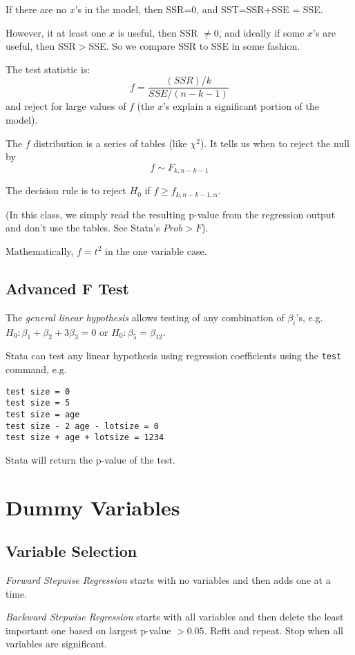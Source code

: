 \documentclass[11pt, oneside]{article}   	%
\begin{document}
If there are no $x$'s in the model, then SSR=0, and SST=SSR+SSE = SSE.

However, it at least one $x$ is useful, then SSR $\neq 0$, and ideally if some $x$'s are useful, then SSR$>$SSE. So we compare SSR to SSE in some fashion.

The test statistic is:
\[
f = \frac{ (SSR)/k} {SSE/(n-k-1)}
\]
and reject for large values of $f$ (the $x$'s explain a significant portion of the model).

The $f$ distribution is a series of tables (like $\chi^2$). It tells us when to reject the null by
\[
f \sim F_{k,n-k-1}
\]

The decision rule is to reject $H_0$ if $f \geq f_{k, n-k-1, \alpha}$.

(In this class, we simply read the resulting p-value from the regression output and don't use the tables. See Stata's $Prob > F$).

Mathematically, $f = t^2$ in the one variable case.

\subsection{Advanced F Test}

The \textit{general linear hypothesis} allows testing of any combination of $\beta_i$'s, e.g. $H_0 : \beta_1 + \beta_2 + 3\beta_3 = 0$ or $H_0 : \beta_5 = \beta_{12}$.

Stata can test any linear hypothesis using regression coefficients using the \texttt{test} command, e.g.

\begin{verbatim}
test size = 0
test size = 5
test size = age
test size - 2 age - lotsize = 0
test size + age + lotsize = 1234
\end{verbatim}

Stata will return the p-value of the test.

\section{Dummy Variables}

\subsection{Variable Selection}

\textit{Forward Stepwise Regression} starts with no variables and then adds one at a time.

\textit{Backward Stepwise Regression} starts with all variables and then delete the least important one based on largest p-value $> 0.05$. Refit and repeat. Stop when all variables are significant.
\end{document}
